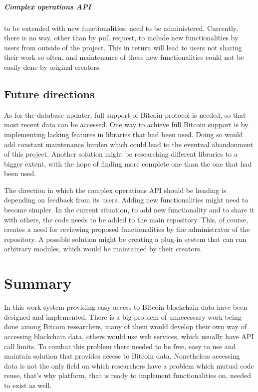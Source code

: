 \documentclass[12pt, en, eng, oneside, final]{mgr}
\begin{document}
\paragraph{Complex operations API} to be extended with new functionalities, need to be administered. Currently, there is no way, other than by pull request, to include new functionalities by users from outside of the project. This in return will lead to users not sharing their work so often, and maintenance of these new functionalities could not be easily done by original creators.

\section{Future directions}
As for the database updater, full support of Bitcoin protocol is needed, so that most recent data can be accessed. One way to achieve full Bitcoin support is by implementing lacking features in libraries that had been used. Doing so would add constant maintenance burden which could lead to the eventual abandonment of this project. Another solution might be researching different libraries to a bigger extent, with the hope of finding more complete one than the one that had been used.

The direction in which the complex operations API should be heading is depending on feedback from its users. Adding new functionalities might need to become simpler. In the current situation, to add new functionality and to share it with others, the code needs to be added to the main repository. This, of course, creates a need for reviewing proposed functionalities by the administrator of the repository. A possible solution might be creating a plug-in system that can run arbitrary modules, which would be maintained by their creators. 

\chapter{Summary}
In this work system providing easy access to Bitcoin blockchain data have been designed and implemented. There is a big problem of unnecessary work being done among Bitcoin researchers, many of them would develop their own way of accessing blockchain data, others would use web services, which usually have API call limits. To combat this problem there needed to be free, easy to use and maintain solution that provides access to Bitcoin data. 
Nonetheless accessing data is not the only field on which researchers have a problem which mutual code reuse, that's why platform, that is ready to implement functionalities on, needed to exist as well. 
\end{document}

